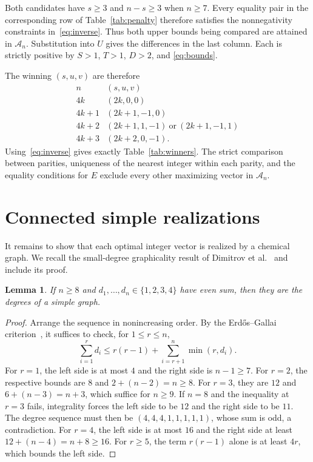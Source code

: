 \documentclass[11pt]{article}
\newtheorem{lemma}[theorem]{Lemma}
\begin{document}
Both candidates have $s\geq3$ and $n-s\geq3$ when $n\geq7$.
Every equality pair in the corresponding row of
Table~\ref{tab:penalty} therefore satisfies the nonnegativity constraints
in~\eqref{eq:inverse}. Thus both upper bounds being compared are attained
in $\mathcal A_n$. Substitution into $U$ gives the differences in the last
column. Each is strictly positive by $S>1$, $T>1$, $D>2$, and
\eqref{eq:bounds}.

The winning $(s,u,v)$ are therefore
\[
\begin{array}{c|c}
n & (s,u,v)\\ \hline
4k & (2k,0,0)\\
4k+1 & (2k+1,-1,0)\\
4k+2 & (2k+1,1,-1)\ \text{or}\ (2k+1,-1,1)\\
4k+3 & (2k+2,0,-1).
\end{array}
\]
Using~\eqref{eq:inverse} gives exactly Table~\ref{tab:winners}.
The strict comparison between parities, uniqueness of the nearest integer
within each parity, and the equality conditions for $E$ exclude every
other maximizing vector in $\mathcal A_n$.

\section{Connected simple realizations}

It remains to show that each optimal integer vector is realized by a
chemical graph. We recall the small-degree graphicality result of
Dimitrov et al.~\cite[Proposition~2.2]{dimitrov} and include its proof.

\begin{lemma}\label{lem:graphical}
If $n\geq8$ and $d_1,\ldots,d_n\in\{1,2,3,4\}$ have even sum, then
they are the degrees of a simple graph.
\end{lemma}
\begin{proof}
Arrange the sequence in nonincreasing order. By the Erd\H os--Gallai
criterion~\cite{erdosgallai}, it suffices to check, for $1\leq r\leq n$,
\[
 \sum_{i=1}^r d_i\leq r(r-1)+\sum_{i=r+1}^n\min(r,d_i).
\]
For $r=1$, the left side is at most $4$ and the right side is $n-1\geq7$.
For $r=2$, the respective bounds are $8$ and $2+(n-2)=n\geq8$.
For $r=3$, they are $12$ and $6+(n-3)=n+3$, which suffice for $n\geq9$.
If $n=8$ and the inequality at $r=3$ fails, integrality forces the left
side to be $12$ and the right side to be $11$. The degree sequence must
then be $(4,4,4,1,1,1,1,1)$, whose sum is odd, a contradiction.
For $r=4$, the left side is at most $16$ and the right side at least
$12+(n-4)=n+8\geq16$. For $r\geq5$, the term $r(r-1)$ alone is at
least $4r$, which bounds the left side.
\end{proof}
\end{document}
